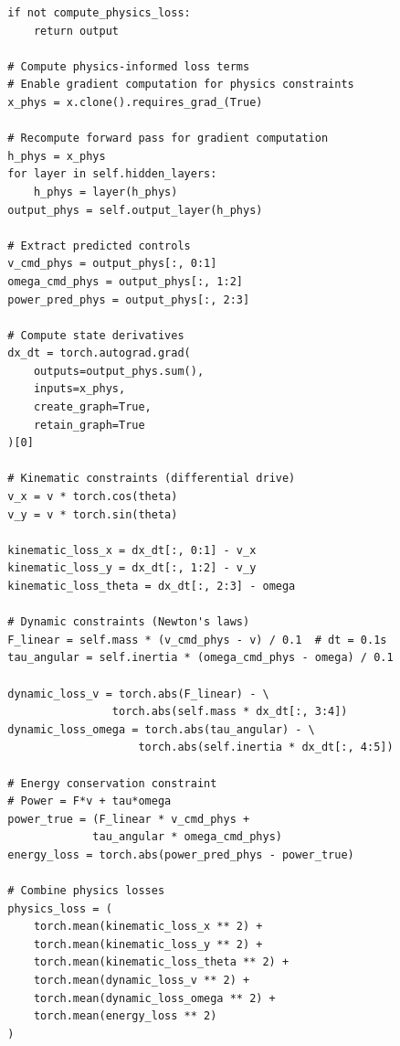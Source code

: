 \begin{lstlisting}
        if not compute_physics_loss:
            return output
        
        # Compute physics-informed loss terms
        # Enable gradient computation for physics constraints
        x_phys = x.clone().requires_grad_(True)
        
        # Recompute forward pass for gradient computation
        h_phys = x_phys
        for layer in self.hidden_layers:
            h_phys = layer(h_phys)
        output_phys = self.output_layer(h_phys)
        
        # Extract predicted controls
        v_cmd_phys = output_phys[:, 0:1]
        omega_cmd_phys = output_phys[:, 1:2]
        power_pred_phys = output_phys[:, 2:3]
        
        # Compute state derivatives
        dx_dt = torch.autograd.grad(
            outputs=output_phys.sum(),
            inputs=x_phys,
            create_graph=True,
            retain_graph=True
        )[0]
        
        # Kinematic constraints (differential drive)
        v_x = v * torch.cos(theta)
        v_y = v * torch.sin(theta)
        
        kinematic_loss_x = dx_dt[:, 0:1] - v_x
        kinematic_loss_y = dx_dt[:, 1:2] - v_y
        kinematic_loss_theta = dx_dt[:, 2:3] - omega
        
        # Dynamic constraints (Newton's laws)
        F_linear = self.mass * (v_cmd_phys - v) / 0.1  # dt = 0.1s
        tau_angular = self.inertia * (omega_cmd_phys - omega) / 0.1
        
        dynamic_loss_v = torch.abs(F_linear) - \
                        torch.abs(self.mass * dx_dt[:, 3:4])
        dynamic_loss_omega = torch.abs(tau_angular) - \
                            torch.abs(self.inertia * dx_dt[:, 4:5])
        
        # Energy conservation constraint
        # Power = F*v + tau*omega
        power_true = (F_linear * v_cmd_phys + 
                     tau_angular * omega_cmd_phys)
        energy_loss = torch.abs(power_pred_phys - power_true)
        
        # Combine physics losses
        physics_loss = (
            torch.mean(kinematic_loss_x ** 2) +
            torch.mean(kinematic_loss_y ** 2) +
            torch.mean(kinematic_loss_theta ** 2) +
            torch.mean(dynamic_loss_v ** 2) +
            torch.mean(dynamic_loss_omega ** 2) +
            torch.mean(energy_loss ** 2)
        )
        

\end{lstlisting}
